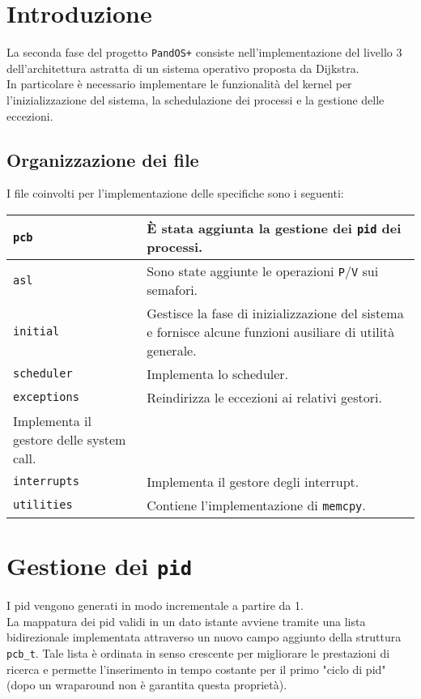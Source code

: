 \documentclass[11pt]{article}
\begin{document}
\newpage

\section{Introduzione}
La seconda fase del progetto \texttt{PandOS+} consiste nell'implementazione del livello 3 dell'architettura astratta di un sistema operativo proposta da Dijkstra. \\
In particolare è necessario implementare le funzionalità del kernel per l'inizializzazione del sistema, la schedulazione dei processi e la gestione delle eccezioni.

\subsection{Organizzazione dei file}
I file coinvolti per l'implementazione delle specifiche sono i seguenti:
\begin{center}
    \begin{tabular}{ | m{3cm} | m{10cm} | } 
        \hline
        \texttt{pcb}          & È stata aggiunta la gestione dei \texttt{pid} dei processi. \\ 
        \hline
        \texttt{asl}          & Sono state aggiunte le operazioni \texttt{P}/\texttt{V} sui semafori. \\ 
        \hline
        \texttt{initial}      & Gestisce la fase di inizializzazione del sistema e fornisce alcune funzioni ausiliare di utilità generale. \\ 
        \hline
        \texttt{scheduler}    & Implementa lo scheduler. \\ 
        \hline
        \texttt{exceptions}   & Reindirizza le eccezioni ai relativi gestori.\\
        Implementa il gestore delle system call. \\ 
        \hline
        \texttt{interrupts}   & Implementa il gestore degli interrupt. \\ 
        \hline
        \texttt{utilities}    & Contiene l'implementazione di \texttt{memcpy}. \\ 
        \hline
    \end{tabular}
\end{center}

\section{Gestione dei \texttt{pid}}
I pid vengono generati in modo incrementale a partire da 1.\\
La mappatura dei pid validi in un dato istante avviene tramite una lista bidirezionale implementata attraverso un nuovo campo aggiunto della struttura \texttt{pcb\_t}.
Tale lista è ordinata in senso crescente per migliorare le prestazioni di ricerca e permette l'inserimento in tempo costante per il primo "ciclo di pid" (dopo un wraparound non è garantita questa proprietà).
\end{document}
